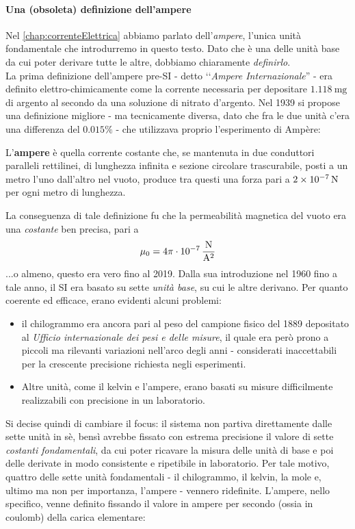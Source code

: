\paragraph{Una (obsoleta) definizione dell'ampere}
Nel \autoref{chap:correnteElettrica} abbiamo parlato dell'\textit{ampere}, l'unica unità fondamentale che introdurremo in questo testo. Dato che è una delle unità base da cui poter derivare tutte le altre, dobbiamo chiaramente \textit{definirlo}.\\
La prima definizione dell'ampere pre-SI - detto ‘‘\textit{Ampere Internazionale}'' - era definito elettro-chimicamente come la corrente necessaria per depositare $\SI{1.118}{\milli\gram}$ di argento al secondo da una soluzione di nitrato d'argento. Nel 1939 si propose una definizione migliore - ma tecnicamente diversa, dato che fra le due unità c'era una differenza del $0.015\%$ - che utilizzava proprio l'esperimento di Ampère:
\begin{define}[Ampere {(1960)}]
	L'\textbf{ampere} è quella corrente costante che, se mantenuta in due conduttori paralleli rettilinei, di lunghezza infinita e sezione circolare trascurabile, posti a un metro l'uno dall'altro nel vuoto, produce tra questi una forza pari a $\SI{2d-7}{\newton}$ per ogni metro di lunghezza.
\end{define}
La conseguenza di tale definizione fu che la permeabilità magnetica del vuoto era una \textit{costante} ben precisa, pari a
\begin{equation*}
	\mu_0=4\pi\cdot\SI[per-mode = fraction]{d-7}{\newton\per\ampere\squared}
\end{equation*}
...o almeno, questo era vero fino al 2019. Dalla sua introduzione nel 1960 fino a tale anno, il SI era basato su sette \textit{unità base}, su cui le altre derivano. Per quanto coerente ed efficace, erano evidenti alcuni problemi:
\begin{itemize}
	\item il chilogrammo era ancora pari al peso del campione fisico del 1889 depositato al \textit{Ufficio internazionale dei pesi e delle misure}, il quale era però prono a piccoli ma rilevanti variazioni nell'arco degli anni - considerati inaccettabili per la crescente precisione richiesta negli esperimenti.
	\item Altre unità, come il kelvin e l'ampere, erano basati su misure difficilmente realizzabili con precisione in un laboratorio. 
\end{itemize}
Si decise quindi di cambiare il focus: il sistema non partiva direttamente dalle sette unità in sè, bensì avrebbe fissato con estrema precisione il valore di sette \textit{costanti fondamentali}, da cui poter ricavare la misura delle unità di base e poi delle derivate in modo consistente e ripetibile in laboratorio. Per tale motivo, quattro delle sette unità fondamentali - il chilogrammo, il kelvin, la mole e, ultimo ma non per importanza, l'ampere - vennero ridefinite. L'ampere, nello specifico, venne definito fissando il valore in ampere per secondo (ossia in coulomb) della carica elementare:
